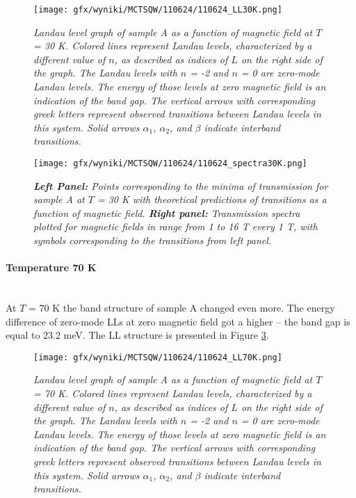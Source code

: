 \documentclass[titlepage,a4paper]{book}
\newcommand{\wciecie}{\quad\phantom{v}}
\newcommand{\myparagraph}[1]{\paragraph{#1}\mbox{}\\}
\begin{document}
\begin{figure}[ht]
	\centering
	\texttt{[image: gfx/wyniki/MCTSQW/110624/110624\_LL30K.png]}
	\vspace{-10pt}
	\caption{\textit{Landau level graph of sample A as a function of magnetic field at $T$ = 30 K. Colored lines represent Landau levels, characterized by a different value of $n$, as described as indices of $L$ on the right side of the graph. The Landau levels with $n$ = -2 and $n$ = 0 are zero-mode Landau levels. The energy of those levels at zero magnetic field is an indication of the band gap. The vertical arrows with corresponding greek letters represent observed transitions between Landau levels in this system. Solid arrows $\alpha_1$, $\alpha_2$, and $\beta$ indicate interband transitions.}}
	\label{fig:LL_110624_30K}
\end{figure}

\begin{figure}[ht]
	\centering
	\texttt{[image: gfx/wyniki/MCTSQW/110624/110624\_spectra30K.png]}
	\vspace{-10pt}
	\caption{\textit{\textbf{Left Panel:} Points corresponding to the minima of transmission for sample A at $T$ = 30 K with theoretical predictions of transitions as a function of magnetic field. \textbf{Right panel:} Transmission spectra plotted for magnetic fields in range from 1 to 16 T every 1 T, with symbols corresponding to the transitions from left panel.}}
	\label{fig:Spectra_110624_30K}
\end{figure}

\clearpage
\myparagraph{Temperature 70 K}
\wciecie
At $T$ = 70 K the band structure of sample A changed even more. The energy difference of zero-mode LLs at zero magnetic field got a higher -- the band gap is equal to 23.2 meV. The LL structure is presented in Figure \ref{fig:LL_110624_70K}.

\begin{figure}[ht]
	\centering
	\texttt{[image: gfx/wyniki/MCTSQW/110624/110624\_LL70K.png]}
	\vspace{-10pt}
	\caption{\textit{Landau level graph of sample A as a function of magnetic field at $T$ = 70 K. Colored lines represent Landau levels, characterized by a different value of $n$, as described as indices of $L$ on the right side of the graph. The Landau levels with $n$ = -2 and $n$ = 0 are zero-mode Landau levels. The energy of those levels at zero magnetic field is an indication of the band gap. The vertical arrows with corresponding greek letters represent observed transitions between Landau levels in this system. Solid arrows $\alpha_1$, $\alpha_2$, and $\beta$ indicate interband transitions.}}
	\label{fig:LL_110624_70K}
\end{figure}
\end{document}
